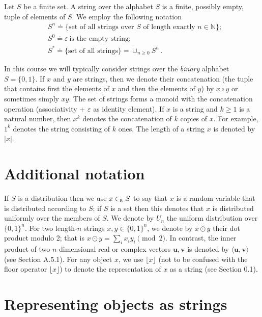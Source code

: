\begin{definition}[String]
	Let $S$ be a finite set. A string over the alphabet $S$ is a finite, possibly empty, tuple of elements of $S$. We employ the following notation
	\begin{align*}
		 & S^n \doteq \{ \text{set of all strings over $S$ of length exactly } n \in \mathbb{N} \}; \\
		 & S^0 \doteq \varepsilon \  \text{is the empty string};                                    \\
		 & S^* \doteq \{ \text{set of all strings} \} = \cup_{n\geq0}S^n \, .
	\end{align*}
\end{definition}
In this course we will typically consider strings over the \emph{binary} alphabet $S = \{0,1\}$.
If $x$ and $y$ are strings, then we denote their concatenation (the tuple that contains first the elements of $x$ and then the elements of $y$) by $x \circ y$ or sometimes simply $xy$. The set of strings forms a monoid with the concatenation operation (associativity + $\varepsilon$ as identity element).
If $x$ is a string and $k \geq 1$ is a natural number, then $x^k$ denotes the concatenation of $k$ copies of $x$.
For example, $1^k$ denotes the string consisting of $k$ ones.
The length of a string $x$ is denoted by $|x|$.

\section*{Additional notation}
If $S$ is a distribution then we use $x \in_{\scriptscriptstyle\text{R}} S$ to say that $x$ is a random variable that is distributed according to $S$; if $S$ is a set then this denotes that $x$ is distributed uniformly over the members of $S$. We denote by $U_n$ the uniform distribution over $\{0,1\}^n$. For two length-$n$ strings $x,y \in \{0,1\}^n$, we denote by $x \odot y$ their dot product modulo 2; that is $x \odot y = \sum_i x_iy_i \pmod{2}$. In contrast, the inner product of two $n$-dimensional real or complex vectors $\bm{u},\bm{v}$ is denoted by $\langle\bm{u},\bm{v}\rangle$ (see Section A.5.1). For any object $x$, we use $\lfloor x \rfloor$ (not to be confused with the floor operator $\lfloor x \rfloor$) to denote the representation of $x$ as a string (see Section 0.1).

\section{Representing objects as strings}\label{sec:str-representation}

